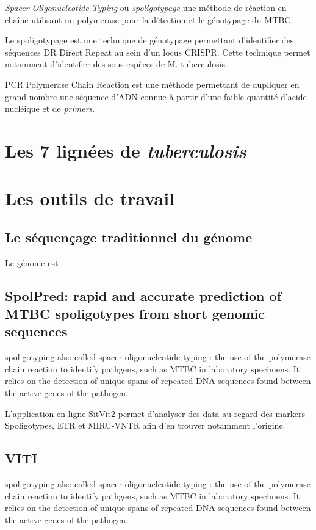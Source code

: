 \documentclass[twoside,a4paper,12pt,frenchb,openany]{report}
\begin{document}
\textit{Spacer Oligonucleotide Typing} ou \textit{spoligotypage} une méthode de réaction en chaîne utilisant un polymerase pour la détection et le génotypage du MTBC.

Le spoligotypage est une technique de génotypage permettant d'identifier des séquences DR Direct Repeat au sein d'un locus CRISPR. Cette technique permet notamment d'identifier des sous-espèces de M. tuberculosis.

PCR Polymerase Chain Reaction est une méthode permettant de dupliquer en grand nombre une séquence d'ADN connue à partir d'une faible quantité d'acide nucléique et de \textit{primers}. 

\section{Les 7 lignées de \textit{tuberculosis}}


\section{Les outils de travail}

\subsection{Le séquençage traditionnel du génome}

Le génome est 

\subsection{SpolPred: rapid and accurate prediction of MTBC spoligotypes from short genomic sequences}

spoligotyping also called spacer oligonucleotide typing : the use of the polymerase chain reaction to identify pathgens, such as MTBC in laboratory specimens. It relies on the detection of unique spans of repeated DNA sequences found between the active genes of the pathogen.

L'application en ligne SitVit2 permet d'analyser des data au regard des markers Spoligotypes, ETR et MIRU-VNTR afin d'en trouver notamment l'origine.

\subsection{VITI}

spoligotyping also called spacer oligonucleotide typing : the use of the polymerase chain reaction to identify pathgens, such as MTBC in laboratory specimens. It relies on the detection of unique spans of repeated DNA sequences found between the active genes of the pathogen.
\end{document}
